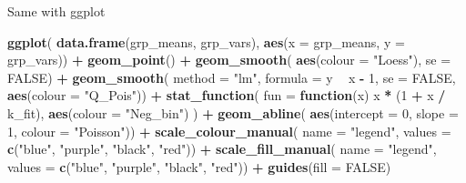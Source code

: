 \documentclass[
  12pt,
]{book}
\newenvironment{Shaded}{\begin{snugshade}}{\end{snugshade}}
\newcommand{\ControlFlowTok}[1]{\textcolor[rgb]{0.13,0.29,0.53}{\textbf{#1}}}
\newcommand{\DataTypeTok}[1]{\textcolor[rgb]{0.13,0.29,0.53}{#1}}
\newcommand{\DecValTok}[1]{\textcolor[rgb]{0.00,0.00,0.81}{#1}}
\newcommand{\KeywordTok}[1]{\textcolor[rgb]{0.13,0.29,0.53}{\textbf{#1}}}
\newcommand{\NormalTok}[1]{#1}
\newcommand{\OperatorTok}[1]{\textcolor[rgb]{0.81,0.36,0.00}{\textbf{#1}}}
\newcommand{\OtherTok}[1]{\textcolor[rgb]{0.56,0.35,0.01}{#1}}
\newcommand{\StringTok}[1]{\textcolor[rgb]{0.31,0.60,0.02}{#1}}
\begin{document}
Same with ggplot

\begin{Shaded}
\begin{Highlighting}[]
\KeywordTok{ggplot}\NormalTok{(}
  \KeywordTok{data.frame}\NormalTok{(grp_means, grp_vars),}
  \KeywordTok{aes}\NormalTok{(}\DataTypeTok{x =}\NormalTok{ grp_means, }\DataTypeTok{y =}\NormalTok{ grp_vars)) }\OperatorTok{+}
\StringTok{  }\KeywordTok{geom_point}\NormalTok{() }\OperatorTok{+}
\StringTok{  }\KeywordTok{geom_smooth}\NormalTok{(}
    \KeywordTok{aes}\NormalTok{(}\DataTypeTok{colour =} \StringTok{"Loess"}\NormalTok{), }\DataTypeTok{se =} \OtherTok{FALSE}\NormalTok{) }\OperatorTok{+}
\StringTok{  }\KeywordTok{geom_smooth}\NormalTok{(}
    \DataTypeTok{method =} \StringTok{"lm"}\NormalTok{, }\DataTypeTok{formula =}\NormalTok{ y }\OperatorTok{~}\StringTok{ }\NormalTok{x }\OperatorTok{-}\StringTok{ }\DecValTok{1}\NormalTok{, }\DataTypeTok{se =} \OtherTok{FALSE}\NormalTok{,}
    \KeywordTok{aes}\NormalTok{(}\DataTypeTok{colour =} \StringTok{"Q_Pois"}\NormalTok{)) }\OperatorTok{+}
\StringTok{  }\KeywordTok{stat_function}\NormalTok{(}
    \DataTypeTok{fun =} \ControlFlowTok{function}\NormalTok{(x) x }\OperatorTok{*}\StringTok{ }\NormalTok{(}\DecValTok{1} \OperatorTok{+}\StringTok{ }\NormalTok{x }\OperatorTok{/}\StringTok{ }\NormalTok{k_fit),}
    \KeywordTok{aes}\NormalTok{(}\DataTypeTok{colour =} \StringTok{"Neg_bin"}\NormalTok{)}
\NormalTok{  ) }\OperatorTok{+}
\StringTok{  }\KeywordTok{geom_abline}\NormalTok{(}
    \KeywordTok{aes}\NormalTok{(}\DataTypeTok{intercept =} \DecValTok{0}\NormalTok{, }\DataTypeTok{slope =} \DecValTok{1}\NormalTok{, }\DataTypeTok{colour =} \StringTok{"Poisson"}\NormalTok{)) }\OperatorTok{+}
\StringTok{  }\KeywordTok{scale_colour_manual}\NormalTok{(}
    \DataTypeTok{name =} \StringTok{"legend"}\NormalTok{,}
    \DataTypeTok{values =} \KeywordTok{c}\NormalTok{(}\StringTok{"blue"}\NormalTok{, }\StringTok{"purple"}\NormalTok{, }\StringTok{"black"}\NormalTok{, }\StringTok{"red"}\NormalTok{)) }\OperatorTok{+}
\StringTok{  }\KeywordTok{scale_fill_manual}\NormalTok{(}
    \DataTypeTok{name =} \StringTok{"legend"}\NormalTok{,}
    \DataTypeTok{values =} \KeywordTok{c}\NormalTok{(}\StringTok{"blue"}\NormalTok{, }\StringTok{"purple"}\NormalTok{, }\StringTok{"black"}\NormalTok{, }\StringTok{"red"}\NormalTok{)) }\OperatorTok{+}
\StringTok{  }\KeywordTok{guides}\NormalTok{(}\DataTypeTok{fill =} \OtherTok{FALSE}\NormalTok{)}
\end{Highlighting}
\end{Shaded}
\end{document}
